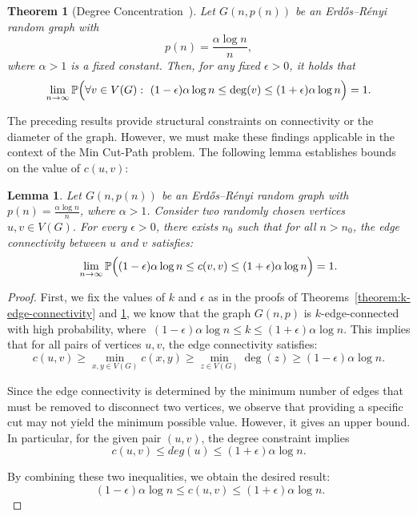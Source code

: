 \documentclass[journal ]{new-aiaa}
\numberwithin{equation}{section}
\theoremstyle{definition}
\theoremstyle{plain}
\newtheorem{theorem}[definition]{Theorem}
\newtheorem{lemma}[definition]{Lemma}
\theoremstyle{remark}
\begin{document}
\begin{theorem}[Degree Concentration~\cite{Bollobas2001}]
\label{theorem:degree_concentration}
Let \( G(n, p(n)) \) be an Erdős–Rényi random graph with
\[
p(n) = \frac{\alpha \log n}{n},
\]
where \( \alpha > 1 \) is a fixed constant. Then, for any fixed \( \epsilon > 0 \), it holds that
\[
\lim_{n\to\infty} \mathbb{P}\Bigl( \forall v \in V(G): \ (1 - \epsilon)\alpha \log n \leq \deg(v) \leq (1 + \epsilon)\alpha \log n \Bigr) = 1.
\]
\end{theorem}


The preceding results provide structural constraints on connectivity or the diameter of the graph. However, we must make these findings applicable in the context of the Min Cut-Path problem. The following lemma establishes bounds on the value of \( c(u,v) \):

\begin{lemma}
\label{claim:max_degree}
Let \( G(n, p(n)) \) be an Erdős–Rényi random graph with \( p(n) = \frac{\alpha \log n}{n} \), where \( \alpha > 1 \). Consider two randomly chosen vertices \( u, v \in V(G) \). For every \( \epsilon > 0 \), there exists \( n_0 \) such that for all \( n > n_0 \), the edge connectivity between \( u \) and \( v \) satisfies:
\[
\lim_{n\to\infty} \mathbb{P}\Bigl( (1 - \epsilon)\alpha \log n \leq c(v,v) \leq (1 + \epsilon)\alpha \log n \Bigr) = 1.
\]
\end{lemma}


\begin{proof}
First, we fix the values of \(k\) and \(\epsilon\) as in the proofs of Theorems~\ref{theorem:k-edge-connectivity} and \ref{theorem:degree_concentration}, we know that the graph \( G(n, p) \) is \( k \)-edge-connected with high probability, where \(\ (1 - \epsilon)\alpha \log n \leq k \leq (1 + \epsilon)\alpha \log n  \). This implies that for all pairs of vertices \( u, v \), the edge connectivity satisfies:
\[
c(u, v) \geq \min_{x,y \in V(G)} c(x, y) \geq \min_{z \in V(G)} \deg(z) \geq  (1 - \epsilon)\alpha \log n.
\]


Since the edge connectivity is determined by the minimum number of edges that must be removed to disconnect two vertices, we observe that providing a specific cut may not yield the minimum possible value. However, it gives an upper bound. In particular, for the given pair \( (u,v) \), the degree constraint implies
\[
c(u,v)\leq deg(u) \leq (1 + \epsilon)\alpha \log n \Bigr.
\]

By combining these two inequalities, we obtain the desired result:
\[
\ (1 - \epsilon)\alpha \log n \leq c(u,v) \leq (1 + \epsilon)\alpha \log n \Bigr.
\]
\end{proof}
    
\end{document}
